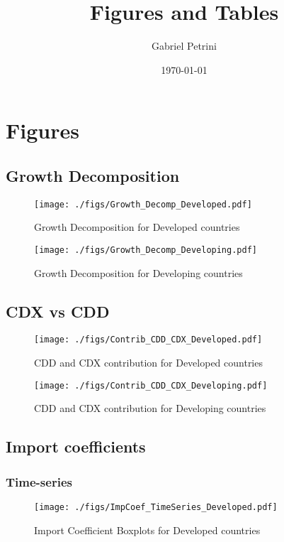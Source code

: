\documentclass[11pt]{article}
\author{Gabriel Petrini}
\date{\today}
\title{Figures and Tables}
\begin{document}
\maketitle
\section{Figures}
\label{sec:org0b4937b}

\subsection{Growth Decomposition}
\label{sec:org5ce25a6}

\begin{figure}[H]
\centering
\texttt{[image: ./figs/Growth\_Decomp\_Developed.pdf]}
\caption{Growth Decomposition for Developed countries}
\end{figure}

\begin{figure}[H]
\centering
\texttt{[image: ./figs/Growth\_Decomp\_Developing.pdf]}
\caption{Growth Decomposition for Developing countries}
\end{figure}
\subsection{CDX vs CDD}
\label{sec:org0c358f1}


\begin{figure}[H]
\centering
\texttt{[image: ./figs/Contrib\_CDD\_CDX\_Developed.pdf]}
\caption{CDD and CDX contribution for Developed countries}
\end{figure}

\begin{figure}[H]
\centering
\texttt{[image: ./figs/Contrib\_CDD\_CDX\_Developing.pdf]}
\caption{CDD and CDX contribution for Developing countries}
\end{figure}
\subsection{Import coefficients}
\label{sec:org1123f2d}

\subsubsection{Time-series}
\label{sec:org968f342}


\begin{figure}[H]
\centering
\texttt{[image: ./figs/ImpCoef\_TimeSeries\_Developed.pdf]}
\caption{Import Coefficient Boxplots for Developed countries}
\end{figure}
\end{document}
